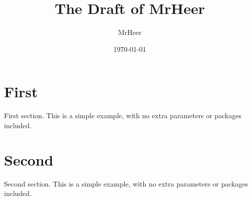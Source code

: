 \documentclass[12pt]{article}
\title{The Draft of MrHeer}
\author{MrHeer}
\date{\today}
\begin{document}
\begin{titlepage}
\maketitle
\thispagestyle{empty}
\end{titlepage}

\begin{center}
\tableofcontents
\end{center}

\newpage
{}
\setcounter{page}{1}
\section{First}
First section. This is a simple example, with no 
extra parameters or packages included.

\newpage
\section{Second}
Second section. This is a simple example, with no 
extra parameters or packages included.
\end{document}
